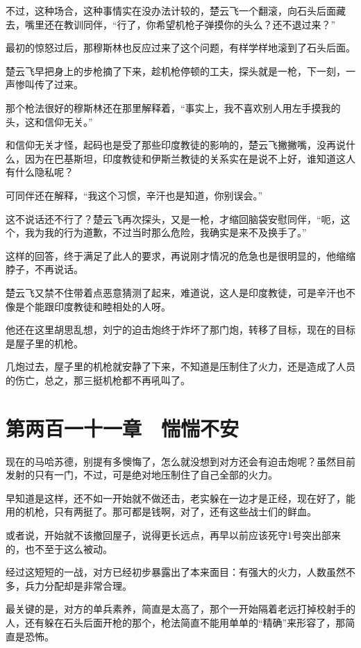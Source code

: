 不过，这种场合，这种事情实在没办法计较的，楚云飞一个翻滚，向石头后面藏去，嘴里还在教训同伴，“行了，你希望机枪子弹摸你的头么？还不退过来？”

最初的惊怒过后，那穆斯林也反应过来了这个问题，有样学样地滚到了石头后面。

楚云飞早把身上的步枪摘了下来，趁机枪停顿的工夫，探头就是一枪，下一刻，一声惨叫传了过来。

那个枪法很好的穆斯林还在那里解释着，“事实上，我不喜欢别人用左手摸我的头，这和信仰无关。”

和信仰无关才怪，起码也是受了那些印度教徒的影响的，楚云飞撇撇嘴，没再说什么，因为在巴基斯坦，印度教徒和伊斯兰教徒的关系实在是说不上好，谁知道这人有什么隐私呢？

可同伴还在解释，“我这个习惯，辛汗也是知道，你别误会。”

这不说话还不行了？楚云飞再次探头，又是一枪，才缩回脑袋安慰同伴，“呃，这个，我为我的行为道歉，不过当时那么危险，我确实是来不及换手了。”

这样的回答，终于满足了此人的要求，再说刚才情况的危急也是很明显的，他缩缩脖子，不再说话。

楚云飞又禁不住带着点恶意猜测了起来，难道说，这人是印度教徒，可是辛汗也不像是个能跟印度教徒和睦相处的人呀。

他还在这里胡思乱想，刘宁的迫击炮终于炸坏了那门炮，转移了目标，现在的目标是屋子里的机枪。

几炮过去，屋子里的机枪就安静了下来，不知道是压制住了火力，还是造成了人员的伤亡，总之，那三挺机枪都不再吼叫了。

\section{第两百一十一章　惴惴不安}

现在的马哈苏德，别提有多懊悔了，怎么就没想到对方还会有迫击炮呢？虽然目前发射的只有一门，不过，可是绝对地压制住了自己全部的火力。

早知道是这样，还不如一开始就不做还击，老实躲在一边才是正经，现在好了，能用的机枪，只有两挺了。那可都是钱啊，对了，还有这些战士们的鲜血。

或者说，开始就不该撤回屋子，说得更长远点，再早以前应该死守1号突出部来的，也不至于这么被动。

经过这短短的一战，对方已经初步暴露出了本来面目：有强大的火力，人数虽然不多，兵力分配却是非常合理。

最关键的是，对方的单兵素养，简直是太高了，那个一开始隔着老远打掉校射手的人，还有躲在石头后面开枪的那个，枪法简直不能用单单的“精确”来形容了，那简直是恐怖。

